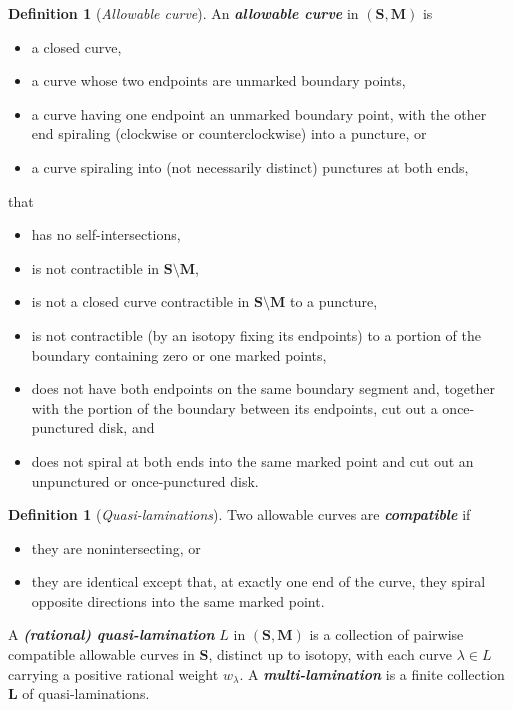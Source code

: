 \documentclass{amsart}
\theoremstyle{definition}
\newtheorem{definition}[proposition]{Definition}
\theoremstyle{remark}
\numberwithin{equation}{section}
\newcommand{\newword}[1]{\textbf{\emph{#1}}}
\newcommand{\0}{{\mathbf{0}}}
\newcommand{\M}{\mathbf{M}}
\renewcommand{\L}{\mathbf{L}}
\renewcommand{\S}{\mathbf{S}}
\begin{document}
\begin{definition}[\emph{Allowable curve}]\label{allowable def}
An \newword{allowable curve} in $(\S,\M)$ is  
\begin{itemize}
\item a closed curve,
\item a curve whose two endpoints are unmarked boundary points,
\item a curve having one endpoint an unmarked boundary point, with the other end spiraling (clockwise or counterclockwise) into a puncture, or
\item a curve spiraling into (not necessarily distinct) punctures at both ends,
\end{itemize}
that
\begin{itemize}
\item has no self-intersections,
\item is not contractible in $\S\setminus\M$,
\item is not a closed curve contractible in $\S\setminus\M$ to a puncture,
\item is not contractible (by an isotopy fixing its endpoints) to a portion of the boundary containing zero or one marked points,
\item does not have both endpoints on the same boundary segment and, together with the portion of the boundary between its endpoints, cut out a once-punctured disk, and 
\item does not spiral at both ends into the same marked point and cut out an unpunctured or once-punctured disk.
\end{itemize}
\end{definition}

\begin{definition}[\emph{Quasi-laminations}]\label{quasilam def}
Two allowable curves are \newword{compatible} if 
\begin{itemize}
\item
they are nonintersecting, or 
\item they are identical except that, at exactly one end of the curve, they spiral opposite directions into the same marked point.
\end{itemize}
A \newword{(rational) quasi-lamination} $L$ in $(\S,\M)$ is a collection of pairwise compatible allowable curves in $\S$, distinct up to isotopy, with each curve $\lambda\in L$ carrying a positive rational weight $w_\lambda$.
A \newword{multi-lamination} is a finite collection $\L$ of quasi-laminations.
\end{definition}
\end{document}

